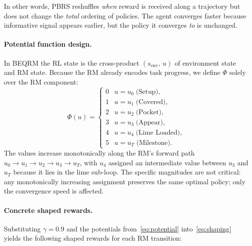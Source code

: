 \documentclass[11pt]{article}
\begin{document}
In other words, PBRS reshuffles \emph{when} reward is received along a trajectory but does not change the \emph{total} ordering of policies. The agent converges faster because informative signal appears earlier, but the policy it converges \emph{to} is unchanged.

\paragraph{Potential function design.}
In BEQRM the RL state is the cross-product $(s_{\mathrm{env}},\, u)$ of environment state and RM state.  Because the RM already encodes task progress, we define $\Phi$ solely over the RM component:
\begin{equation}
\label{eq:potential}
\Phi(u) =
\begin{cases}
0 & u = u_0 \;\text{(Setup)},\\
1 & u = u_1 \;\text{(Covered)},\\
2 & u = u_2 \;\text{(Pocket)},\\
3 & u = u_3 \;\text{(Appear)},\\
4 & u = u_4 \;\text{(Lime Loaded)},\\
5 & u = u_T \;\text{(Milestone)}.
\end{cases}
\end{equation}
The values increase monotonically along the RM's forward path $u_0 \!\to\! u_1 \!\to\! u_2 \!\to\! u_3 \!\to\! u_T$, with $u_4$ assigned an intermediate value between $u_3$ and $u_T$ because it lies in the lime sub-loop.
The specific magnitudes are not critical: any monotonically increasing assignment preserves the same optimal policy; only the convergence speed is affected.

\paragraph{Concrete shaped rewards.}
Substituting $\gamma = 0.9$ and the potentials from~\eqref{eq:potential} into~\eqref{eq:shaping} yields the following shaped rewards for each RM transition:
\end{document}
